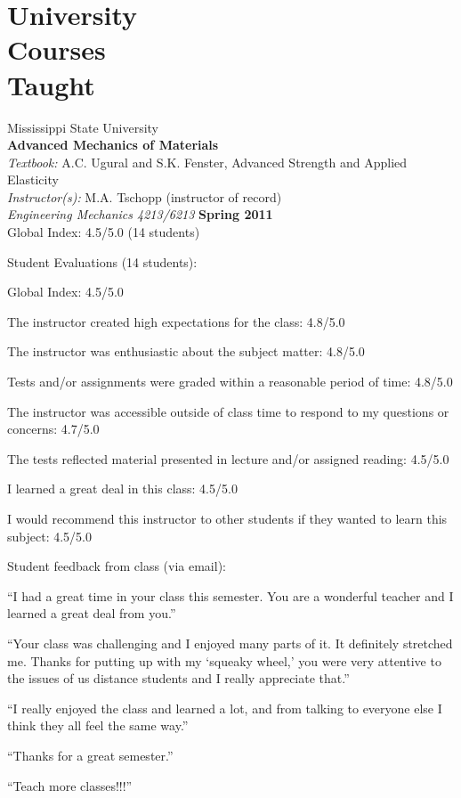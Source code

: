 \section{\sc University\\Courses\\Taught}
Mississippi State University \\
{\bf Advanced Mechanics of Materials} \\ 
{\it Textbook:} A.C. Ugural and S.K. Fenster, {Advanced Strength and Applied Elasticity} \\
{\it Instructor(s):} M.A. Tschopp (instructor of record) \\
{\em Engineering Mechanics 4213/6213} \hfill    {\bf Spring 2011} \\
Global Index: 4.5/5.0 (14 students)

\begin{list2}
\vspace*{.05in}
\item	Student Evaluations (14 students):
\vspace*{.05in}
	\begin{list2}
	\item Global Index: 4.5/5.0
	\item The instructor created high expectations for the class: 4.8/5.0
	\item The instructor was enthusiastic about the subject matter: 4.8/5.0
	\item Tests and/or assignments were graded within a reasonable period of time: 4.8/5.0
	\item The instructor was accessible outside of class time to respond to my questions or concerns: 4.7/5.0
	\item The tests reflected material presented in lecture and/or assigned reading: 4.5/5.0
	\item I learned a great deal in this class: 4.5/5.0
	\item I would recommend this instructor to other students if they wanted to learn this subject: 4.5/5.0	
	\end{list2}
	\item	Student feedback from class (via email):
\vspace*{.05in}
	\begin{list2}
	\item ``I had a great time in your class this semester. You are a wonderful teacher and I learned a great deal from you.''
	\item ``Your class was challenging and I enjoyed many parts of it.  It definitely stretched me.  Thanks for putting up with my `squeaky wheel,' you were very attentive to the issues of us distance students and I really appreciate that.''
	\item ``I really enjoyed the class and learned a lot, and from talking to everyone else I think they all feel the same way.''
	\item ``Thanks for a great semester.''
	\item ``Teach more classes!!!''
	\end{list2}
\end{list2}

